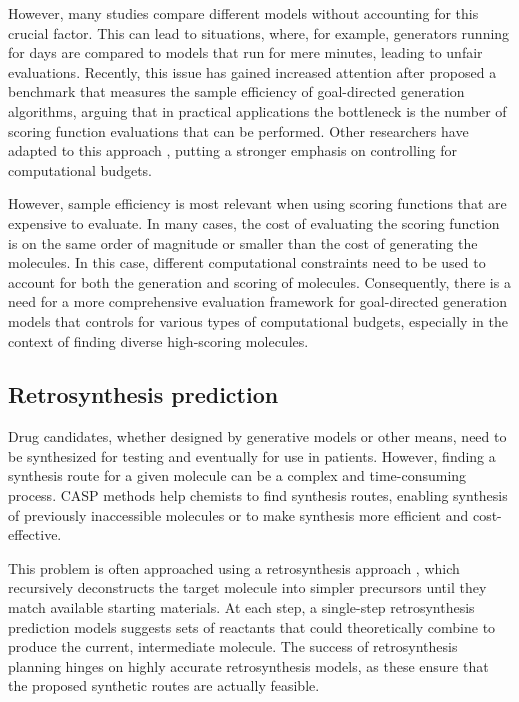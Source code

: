 However, many studies compare different models without accounting for this crucial factor. This can
lead to situations, where, for example, generators running for days are compared to models that run
for mere minutes, leading to unfair evaluations. Recently, this issue has gained increased attention
after \citep{gaoSampleEfficiencyMatters2022} proposed a benchmark that measures the sample
efficiency of goal-directed generation algorithms, arguing that in practical applications the
bottleneck is the number of scoring function evaluations that can be performed. Other researchers
have adapted to this approach
\citep{thomasReevaluatingSampleEfficiency2022,thomasAugmentedHillClimbIncreases2022,guoAugmentedMemorySampleEfficient2024},
putting a stronger emphasis on controlling for computational budgets.

However, sample efficiency is most relevant when using scoring functions that are expensive to
evaluate. In many cases, the cost of evaluating the scoring function is on the same order of
magnitude or smaller than the cost of generating the molecules. In this case, different
computational constraints need to be used to account for both the generation and scoring of
molecules. Consequently, there is a need for a more comprehensive evaluation framework for
goal-directed generation models that controls for various types of computational budgets, especially
in the context of finding diverse high-scoring molecules.

\subsection{Retrosynthesis prediction}
Drug candidates, whether designed by generative models or other means, need to be
synthesized for testing and eventually for use in patients. However, finding a synthesis route for a
given molecule can be a complex and time-consuming process. \Ac{CASP} methods help
chemists to find synthesis routes, enabling synthesis of previously inaccessible molecules or to make
synthesis more efficient and cost-effective.

This problem is often approached using a retrosynthesis approach
\citep{coreyLogicChemicalSynthesis1989}, which
recursively deconstructs the target molecule into simpler precursors until they match available
starting materials. At each step, a single-step retrosynthesis prediction models suggests sets of
reactants that could theoretically combine to produce the current, intermediate molecule.
The success of retrosynthesis planning hinges on highly accurate retrosynthesis models, as these
ensure that the proposed synthetic routes are actually feasible.

